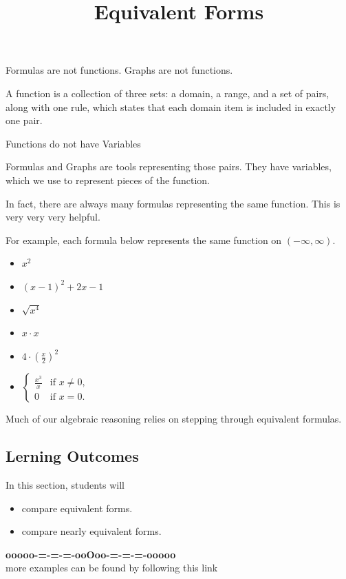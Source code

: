 \documentclass{ximera}
\title{Equivalent Forms}
\begin{document}
\begin{abstract}
\end{abstract}
\maketitle




Formulas are not functions.  Graphs are not functions. 


A function is a collection of three sets: a domain, a range, and a set of pairs, along with one rule, which states that each domain item is included in exactly one pair.

Functions do not have Variables

Formulas and Graphs are tools representing those pairs. They have variables, which we use to represent pieces of the function.  


In fact, there are always many formulas representing the same function. This is very very very helpful.

For example, each formula below represents the same function on $(-\infty, \infty)$.


\begin{itemize}
\item $x^2$
\item $(x - 1)^2 + 2 x - 1$
\item $\sqrt{x^4}$
\item $ x \cdot x$
\item $ 4 \cdot \left( \frac{x}{2} \right)^2$
\item $\begin{cases}
  \frac{x^3}{x} &\text{if $x \ne 0$,}\\
  0 &\text{if $x = 0$}.
\end{cases}$
\end{itemize}




Much of our algebraic reasoning relies on stepping through equivalent formulas.




\subsection*{Lerning Outcomes}


\begin{sectionOutcomes}
In this section, students will 

\begin{itemize}
\item compare equivalent forms.
\item compare nearly equivalent forms.
\end{itemize}
\end{sectionOutcomes}










\begin{center}
\textbf{\textcolor{green!50!black}{ooooo-=-=-=-ooOoo-=-=-=-ooooo}} \\

more examples can be found by following this link\\ 

\end{center}
\end{document}
